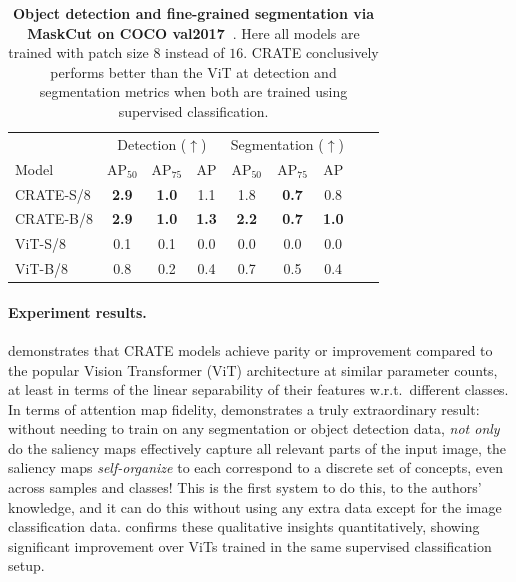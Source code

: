 \documentclass[../../book-main.tex]{subfiles}
\begin{document}
\begin{table}
    \centering
    \begin{tabular}{@{}lcccccccc@{}}
    \toprule
     &  \multicolumn{3}{c}{Detection (\(\uparrow\))} &  \multicolumn{3}{c}{Segmentation (\(\uparrow\))} \\ 
    Model & AP$_{50}$ & AP$_{75}$ & AP & AP$_{50}$ & AP$_{75}$ & AP  \\ 
    \midrule
    CRATE-S/8 & \textbf{2.9} & \textbf{1.0} & 1.1 & 1.8 & \textbf{0.7} & 0.8 \\
    CRATE-B/8 & \textbf{2.9} & \textbf{1.0} & \textbf{1.3} & \textbf{2.2} & \textbf{0.7} & \textbf{1.0} \\
    ViT-S/8 & 0.1& 0.1 & 0.0 & 0.0 & 0.0 & 0.0 \\
    ViT-B/8 & 0.8 & 0.2 & 0.4 & 0.7 & 0.5 & 0.4 \\
    \bottomrule
    \end{tabular}
    \caption{\small \textbf{Object detection and fine-grained segmentation via MaskCut on COCO {val2017}~\citep{lin2014microsoft}}. Here all models are trained with patch size \(8\) instead of \(16\). CRATE conclusively performs better than the ViT at detection and segmentation metrics when both are trained using supervised classification.}
    \label{tab:crate_detection_segmentation}
\end{table}


\paragraph{Experiment results.} 

 demonstrates that CRATE models achieve parity or improvement compared to the popular Vision Transformer (ViT) architecture at similar parameter counts, at least in terms of the linear separability of their features w.r.t.~different classes. In terms of attention map fidelity,  demonstrates a truly extraordinary result: without needing to train on any segmentation or object detection data, \textit{not only} do the saliency maps effectively capture all relevant parts of the input image, the saliency maps \textit{self-organize} to each correspond to a discrete set of concepts, even across samples and classes! This is the first system to do this, to the authors' knowledge, and it can do this without using any extra data except for the image classification data.  confirms these qualitative insights quantitatively, showing significant improvement over ViTs trained in the same supervised classification setup.
\end{document}
